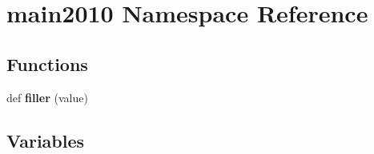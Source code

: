 \hypertarget{namespacemain2010}{}\section{main2010 Namespace Reference}
\label{namespacemain2010}
\subsection*{Functions}
\begin{DoxyCompactItemize}
\item 
def {\bfseries filler} (value)\hypertarget{namespacemain2010_a0a242eb9c5b6fab98c4944870dc2b1d8}{}\label{namespacemain2010_a0a242eb9c5b6fab98c4944870dc2b1d8}

\end{DoxyCompactItemize}
\subsection*{Variables}
